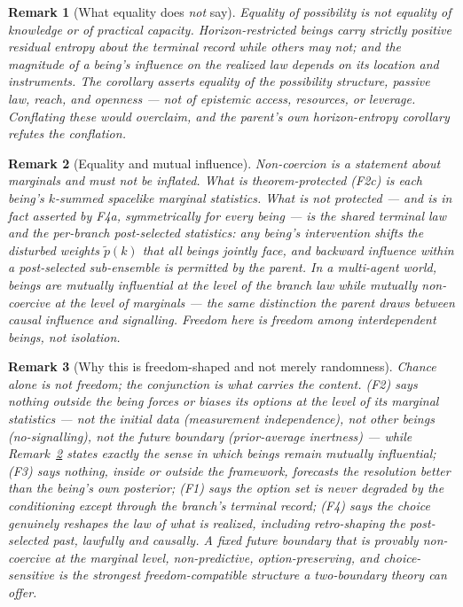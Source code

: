 \documentclass[11pt]{article}
\newtheorem{remark}{Remark}
\begin{document}
\begin{remark}[What equality does \emph{not} say]\label{rem:not-equal}
Equality of possibility is not equality of knowledge or of practical capacity.
Horizon-restricted beings carry strictly positive residual entropy about the
terminal record while others may not;
and the magnitude of a being's influence on the realized law depends on its
location and instruments. The corollary asserts equality of the
\emph{possibility structure, passive law, reach, and openness} --- not of
epistemic access, resources, or leverage. Conflating these would overclaim, and
the parent's own horizon-entropy corollary refutes the conflation.
\end{remark}

\begin{remark}[Equality and mutual influence]\label{rem:mutual}
Non-coercion is a statement about marginals and must not be inflated. What is
theorem-protected (F2c) is each being's $k$-summed spacelike marginal
statistics. What is \emph{not} protected --- and is in fact asserted by F4a,
symmetrically for every being --- is the shared terminal law and the per-branch
post-selected statistics: any being's intervention shifts the disturbed weights
$\widetilde p(k)$ that all beings jointly face, and backward influence within a
post-selected sub-ensemble is permitted by the parent.
In a multi-agent world, beings are mutually \emph{influential} at the level of
the branch law while mutually \emph{non-coercive} at the level of marginals ---
the same distinction the parent draws between causal influence and signalling.
Freedom here is freedom among interdependent beings, not isolation.
\end{remark}

\begin{remark}[Why this is freedom-shaped and not merely randomness]\label{rem:not-noise}
Chance alone is not freedom; the conjunction is what carries the content. (F2)
says nothing outside the being forces or biases its options at the level of its
marginal statistics --- not the initial data (measurement independence), not
other beings (no-signalling), not the future boundary (prior-average inertness)
--- while Remark~\ref{rem:mutual} states exactly the sense in which beings
remain mutually influential; (F3) says nothing, inside or outside the
framework, forecasts the resolution better than the being's own posterior; (F1)
says the option set is never degraded by the conditioning except through the
branch's terminal record; (F4) says the choice genuinely reshapes the law of
what is realized, including retro-shaping the post-selected past, lawfully and
causally. A fixed future boundary that is provably non-coercive at the marginal
level, non-predictive, option-preserving, and choice-sensitive is the strongest
freedom-compatible structure a two-boundary theory can offer.
\end{remark}
\end{document}
